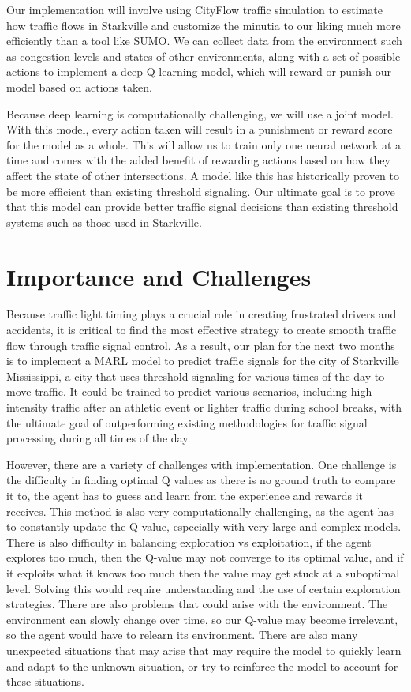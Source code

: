 \documentclass[conference]{IEEEtran}
\begin{document}
Our implementation will involve using CityFlow traffic simulation to estimate how traffic flows in Starkville and customize the minutia to our liking much more efficiently than a tool like SUMO. We can collect data from the environment such as congestion levels and states of other environments, along with a set of possible actions to implement a deep Q-learning model, which will reward or punish our model based on actions taken.

Because deep learning is computationally challenging, we will use a joint model. With this model, every action taken will result in a punishment or reward score for the model as a whole. This will allow us to train only one neural network at a time and comes with the added benefit of rewarding actions based on how they affect the state of other intersections. A model like this has historically proven to be more efficient than existing threshold signaling. Our ultimate goal is to prove that this model can provide better traffic signal decisions than existing threshold systems such as those used in Starkville. 

\section{Importance and Challenges}

Because traffic light timing plays a crucial role in creating frustrated drivers and accidents, it is critical to find the most effective strategy to create smooth traffic flow through traffic signal control. As a result, our plan for the next two months is to implement a MARL model to predict traffic signals for the city of Starkville Mississippi, a city that uses threshold signaling for various times of the day to move traffic. It could be trained to predict various scenarios, including high-intensity traffic after an athletic event or lighter traffic during school breaks, with the ultimate goal of outperforming existing methodologies for traffic signal processing during all times of the day. 

However, there are a variety of challenges with implementation. One challenge is the difficulty in finding optimal Q values as there is no ground truth to compare it to, the agent has to guess and learn from the experience and rewards it receives. This method is also very computationally challenging, as the agent has to constantly update the Q-value, especially with very large and complex models. There is also difficulty in balancing exploration vs exploitation, if the agent explores too much, then the Q-value may not converge to its optimal value, and if it exploits what it knows too much then the value may get stuck at a suboptimal level. Solving this would require understanding and the use of certain exploration strategies. There are also problems that could arise with the environment. The environment can slowly change over time, so our Q-value may become irrelevant, so the agent would have to relearn its environment. There are also many unexpected situations that may arise that may require the model to quickly learn and adapt to the unknown situation, or try to reinforce the model to account for these situations.
\end{document}
